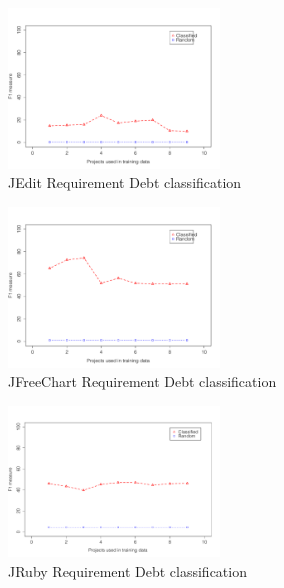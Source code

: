 \begin{figure}[thb!]
  \centering
  \includegraphics[width=0.50\textwidth]{figures/implementation_jedit.pdf}
  \vspace{-3mm}
  \caption{JEdit Requirement Debt classification}
  \label{fig:implementation_jedit}
\end{figure}

\begin{figure}[thb!]
  \centering
  \includegraphics[width=0.50\textwidth]{figures/implementation_jfreechart.pdf}
  \vspace{-3mm}
  \caption{JFreeChart Requirement Debt classification}
  \label{fig:implementation_jfreechart}
\end{figure}

\begin{figure}[thb!]
  \centering
  \includegraphics[width=0.50\textwidth]{figures/implementation_jruby.pdf}
  \vspace{-3mm}
  \caption{JRuby Requirement Debt classification}
  \label{fig:implementation_jruby}
\end{figure}

